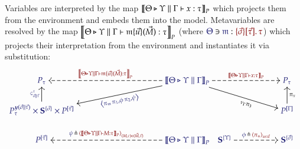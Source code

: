 Variables are interpreted by the map
${\left\llbracket
  \Theta\triangleright\Upsilon\parallel\Gamma\vdash x:\tau
\right\rrbracket}_{P}$ which
projects them from the environment and embeds them into the model. Metavariables
are resolved by the map
${\left\llbracket
  \Theta\triangleright\Upsilon\parallel\Gamma\vdash\mathfrak{m}\{\vec{u}\}(\vec{M})
  : \tau
\right\rrbracket}_{P}$ (where
$\Lookup{\Theta}{\MV{m}}{\MkValence{\vec{\sigma}}{\vec{\tau}}{\tau}}$) which
projects their interpretation from the environment and instantiates it via
substitution:
\[
  \begin{tikzcd}[cramped, ampersand replacement = \&]
    {\IMode{P_\tau}}
\&[8.0em]
    {\IMode{
      {\SemBrackets{
        \Theta\triangleright\Upsilon\parallel\Gamma
      }}_{P}
    }}
      \arrow[
        , rr
        , dashed
        , "
          \OMode{
            {\SemBrackets{
              \Theta\triangleright\Upsilon\parallel\Gamma
              \vdash
              x:\tau
            }}_{P}
          }
          "
      ]
      \ar{drr}[
        , rotate = -16.5
        , xshift = +1.5em
        , yshift = -0.2em
        , swap
      ]{
        {\nu}_{\Gamma} {\pi}_{3}
      }
      \ar{dl}[
        , rotate = +11.5
        , xshift = -2.75em
      ]{
        \IMode{
          \Tuple{
            \pi_\MV{m}\,
            \pi_1,
            \phi\,
            \pi_2,
            \psi
          }
        }
      }
      \arrow[
        , l
        , dashed
        , swap
        , "
          \OMode{
            {\SemBrackets{
              \Theta\triangleright\Upsilon\parallel\Gamma
              \vdash
              \MApp{\MV{m}}{\vec{u}}{\vec{M}}: \tau
            }}_{P}
          }"
      ]
\&[-2.0em]
    \null
\&[+3.0em]
    {\IMode{P_\tau}}
\\
    {\IMode{
      {P}_{\tau}^{
        \Yoneda{\vec{\sigma}\parallel\vec{\tau}}
      }
      \times \SymPsh^{\{\vec{\sigma}\}}
      \times P^{[\vec{\tau}]}
    }}
      \arrow[
        , u
        , "
          \IMode{
            \varsigma^\tau_{\vec{\sigma}\parallel\vec{\tau}}
          }
          "
        ]
\&
    \null
\&
    \null
\&
    {\IMode{P^{[\Gamma]}}}
      \arrow[
        , u
        , swap
        , "{\pi}_{x}"
      ]
\\
    {\IMode{P^{[\vec{\tau}]}}}
\&
    {\IMode{
      {\SemBrackets{
        \Theta\triangleright\Upsilon\parallel\Gamma
      }}_{P}
    }}
      \arrow[
        , dashed
        , l
        , swap
        , "
          \Define{
            \psi\,
          }{
            \,\Tuple{
              {\SemBrackets{
                \Theta\triangleright\Upsilon\parallel\Gamma\vdash M:\tau
              }}_{P}
            }_{(M,\tau)\in (\vec{M},\vec{\tau})}
          }
          "]
\&
    {\IMode{\SymPsh^{\{\Upsilon\}}}}
      \arrow[
        , dashed
        , r
        , "\Define{\phi\,}{\,\Tuple{\pi_u}_{u\in\vec{u}}}"
      ]
\&
    {\IMode{\SymPsh^{\{\vec{\sigma}\}}}}
  \end{tikzcd}
\]


